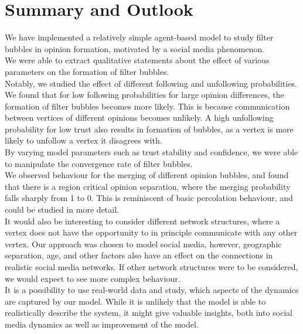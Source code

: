 \documentclass[11pt]{article}
\begin{document}
\section{Summary and Outlook}

We have implemented a relatively simple agent-based model to study filter bubbles in opinion formation, motivated by a social media phenomenon.\\

We were able to extract qualitative statements about the effect of various parameters on the formation of filter bubbles.\\
Notably, we studied the effect of different following and unfollowing probabilities. We found that for low following probabilities for large opinion differences, the formation of filter bubbles becomes more likely. This is because communication between vertices of different opinions becomes unlikely. A high unfollowing probability for low trust also results in formation of bubbles, as a vertex is more likely to unfollow a vertex it disagrees with.\\
By varying model parameters such as trust stability and confidence, we were able to manipulate the convergence rate of filter bubbles.\\

We observed behaviour for the merging of different opinion bubbles, and found that there is a region critical opinion separation, where the merging probability falls sharply from 1 to 0. This is reminiscent of basic percolation behaviour, and could be studied in more detail.\\

It would also be interesting to consider different network structures, where a vertex does not have the opportunity to in principle communicate with any other vertex. Our approach was chosen to model social media, however, geographic separation, age, and other factors also have an effect on the connections in realistic social media networks. If other network structures were to be considered, we would expect to see more complex behaviour.\\

It is a possibility to use real-world data and study, which aspects of the dynamics are captured by our model. While it is unlikely that the model is able to realistically describe the system, it might give valuable insights, both into social media dynamics as well as improvement of the model.
\end{document}
